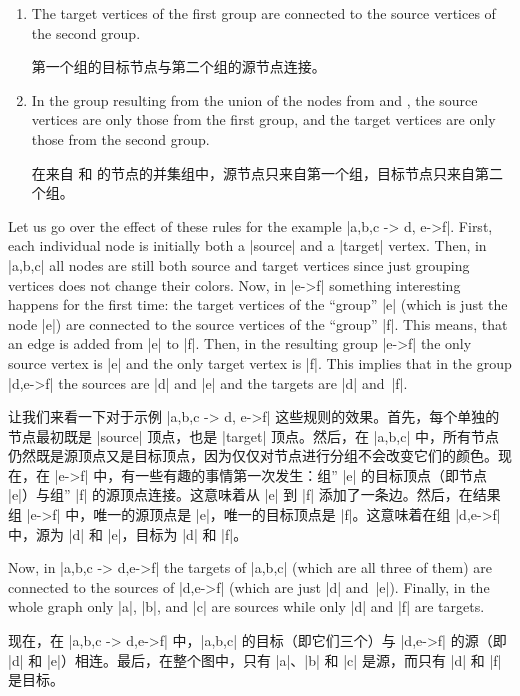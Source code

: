 %
\begin{enumerate}
    \item The target vertices of the first group are connected to the source
        vertices of the second group.

        第一个组的目标节点与第二个组的源节点连接。


    \item In the group resulting from the union of the nodes from
         and , the source vertices are only those
        from the first group, and the target vertices are only those from the
        second group.

        在来自  和  的节点的并集组中，源节点只来自第一个组，目标节点只来自第二个组。
\end{enumerate}

Let us go over the effect of these rules for the example
|{a,b,c} -> {d, e->f}|. First, each individual node is initially both a
|source| and a |target| vertex. Then, in |{a,b,c}| all nodes are still both
source and target vertices since just grouping vertices does not change their
colors. Now, in |e->f| something interesting happens for the first time: the
target vertices of the ``group'' |e| (which is just the node |e|) are connected
to the source vertices of the ``group'' |f|. This means, that an edge is added
from |e| to |f|. Then, in the resulting group |e->f| the only source vertex is
|e| and the only target vertex is |f|. This implies that in the group
|{d,e->f}| the sources are |d| and |e| and the targets are |d| and~|f|.

让我们来看一下对于示例 |{a,b,c} -> {d, e->f}| 这些规则的效果。首先，每个单独的节点最初既是 |source| 顶点，也是 |target| 顶点。然后，在 |{a,b,c}| 中，所有节点仍然既是源顶点又是目标顶点，因为仅仅对节点进行分组不会改变它们的颜色。现在，在 |e->f| 中，有一些有趣的事情第一次发生：组'' |e| 的目标顶点（即节点 |e|）与组'' |f| 的源顶点连接。这意味着从 |e| 到 |f| 添加了一条边。然后，在结果组 |e->f| 中，唯一的源顶点是 |e|，唯一的目标顶点是 |f|。这意味着在组 |{d,e->f}| 中，源为 |d| 和 |e|，目标为 |d| 和 |f|。

Now, in |{a,b,c} -> {d,e->f}| the targets  of |{a,b,c}| (which are all three of
them) are connected to the sources of |{d,e->f}| (which are just |d| and~|e|).
Finally, in the whole graph only |a|, |b|, and |c| are sources while only  |d|
and |f| are targets.

现在，在 |{a,b,c} -> {d,e->f}| 中，|{a,b,c}| 的目标（即它们三个）与 |{d,e->f}| 的源（即 |d| 和 |e|）相连。最后，在整个图中，只有 |a|、|b| 和 |c| 是源，而只有 |d| 和 |f| 是目标。

